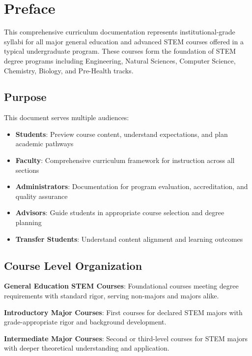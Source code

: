 \documentclass[12pt,oneside]{book}
\begin{document}
\newpage

\tableofcontents

\newpage

\chapter*{Preface}

This comprehensive curriculum documentation represents institutional-grade syllabi for all major general education and advanced STEM courses offered in a typical undergraduate program. These courses form the foundation of STEM degree programs including Engineering, Natural Sciences, Computer Science, Chemistry, Biology, and Pre-Health tracks.

\section*{Purpose}

This document serves multiple audiences:
\begin{itemize}
    \item \textbf{Students}: Preview course content, understand expectations, and plan academic pathways
    \item \textbf{Faculty}: Comprehensive curriculum framework for instruction across all sections
    \item \textbf{Administrators}: Documentation for program evaluation, accreditation, and quality assurance
    \item \textbf{Advisors}: Guide students in appropriate course selection and degree planning
    \item \textbf{Transfer Students}: Understand content alignment and learning outcomes
\end{itemize}

\section*{Course Level Organization}

\textbf{General Education STEM Courses}: Foundational courses meeting degree requirements with standard rigor, serving non-majors and majors alike.

\textbf{Introductory Major Courses}: First courses for declared STEM majors with grade-appropriate rigor and background development.

\textbf{Intermediate Major Courses}: Second or third-level courses for STEM majors with deeper theoretical understanding and application.
\end{document}
